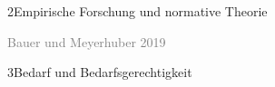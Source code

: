 \documentclass[xcolor=table,9pt,aspectratio=169]{beamer}
\begin{document}
\begin{frame}{\vspace*{10mm}2\hspace*{1em}Empirische Forschung und normative Theorie}
\begin{multicols}{2}
\begin{center}
      \footnotesize{\textcolor{gray}{Bauer und Meyerhuber 2019}}
   \end{center}
\end{multicols}
\end{frame}


\begin{frame}
\begin{overlayarea}{\textwidth}{0.81\paperheight}{
   \vspace*{11mm}
   \textcolor{uolblue}
   {3\hspace*{1em}Bedarf und Bedarfsgerechtigkeit}
}
\end{overlayarea}
\end{frame}
\end{document}
